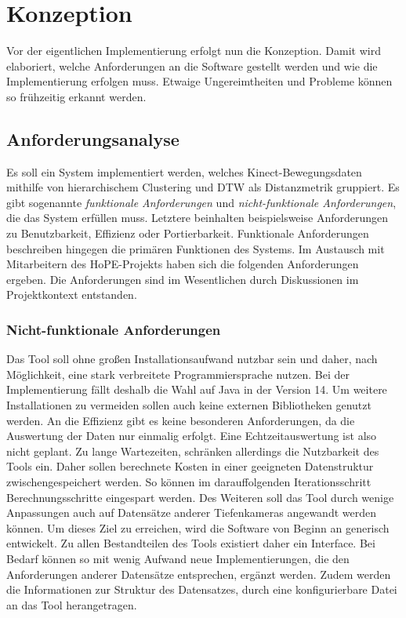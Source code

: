 \chapter{Konzeption}
\label{chapter4}
Vor der eigentlichen Implementierung erfolgt nun die Konzeption.
Damit wird elaboriert, welche Anforderungen an die Software gestellt werden
und wie die Implementierung erfolgen muss.
Etwaige Ungereimtheiten und Probleme können so frühzeitig erkannt werden.

\section{Anforderungsanalyse}
\label{4-Anforderungsanalyse}
Es soll ein System implementiert werden,
welches Kinect-Bewegungsdaten mithilfe von hierarchischem Clustering
und \ac{DTW} als Distanzmetrik gruppiert.
Es gibt sogenannte \emph{funktionale Anforderungen} und \emph{nicht-funktionale Anforderungen},
die das System erfüllen muss.
Letztere beinhalten beispielsweise Anforderungen zu Benutzbarkeit, Effizienz oder Portierbarkeit.
Funktionale Anforderungen beschreiben hingegen die primären Funktionen des Systems.
Im Austausch mit Mitarbeitern des HoPE-Projekts haben sich die folgenden Anforderungen ergeben.
Die Anforderungen sind im Wesentlichen durch Diskussionen im Projektkontext entstanden.

\subsection{Nicht-funktionale Anforderungen}
\label{4-NichtFunktionaleAnforderungen}
Das Tool soll ohne großen Installationsaufwand nutzbar sein
und daher, nach Möglichkeit, eine stark verbreitete Programmiersprache nutzen.
Bei der Implementierung fällt deshalb die Wahl auf Java in der Version 14.
Um weitere Installationen zu vermeiden sollen auch keine externen Bibliotheken genutzt werden.
An die Effizienz gibt es keine besonderen Anforderungen,
da die Auswertung der Daten nur einmalig erfolgt.
Eine Echtzeitauswertung ist also nicht geplant.
Zu lange Wartezeiten, schränken allerdings die Nutzbarkeit des Tools ein.
Daher sollen berechnete Kosten in einer geeigneten Datenstruktur zwischengespeichert werden.
So können im darauffolgenden Iterationsschritt Berechnungsschritte eingespart werden.
Des Weiteren soll das Tool durch wenige Anpassungen auch auf Datensätze anderer Tiefenkameras angewandt werden können.
Um dieses Ziel zu erreichen, wird die Software von Beginn an generisch entwickelt.
Zu allen Bestandteilen des Tools existiert daher ein Interface.
Bei Bedarf können so mit wenig Aufwand neue Implementierungen,
die den Anforderungen anderer Datensätze entsprechen, ergänzt werden.
Zudem werden die Informationen zur Struktur des Datensatzes,
durch eine konfigurierbare Datei an das Tool herangetragen.

